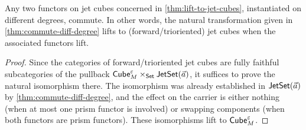 \documentclass[a4paper]{memoir}
\begin{document}
%	
\begin{proposition} \label{thm:cube-commute-diff-degree}
	Any two functors on jet cubes concerned in \cref{thm:lift-to-jet-cubes}, instantiated on different degrees, commute.
	In other words, the natural transformation given in \cref{thm:commute-diff-degree} lifts to (forward/trioriented) jet cubes when the associated functors lift.
\end{proposition}
\begin{proof}
	Since the categories of forward/trioriented jet cubes are fully faithful subcategories of the pullback ${\mathsf{Cube}}_M^\varepsilon \times_{\mathsf{Set}} \mathsf{JetSet}(\vec a)$, it suffices to prove the natural isomorphism there.
	The isomorphism was already established in $\mathsf{JetSet}(\vec a)$ by \cref{thm:commute-diff-degree}, and the effect on the carrier is either nothing (when at most one prism functor is involved) or swapping components (when both functors are prism functors).
	These isomorphisms lift to ${\mathsf{Cube}}_M^\varepsilon$.
\end{proof}
\end{document}
